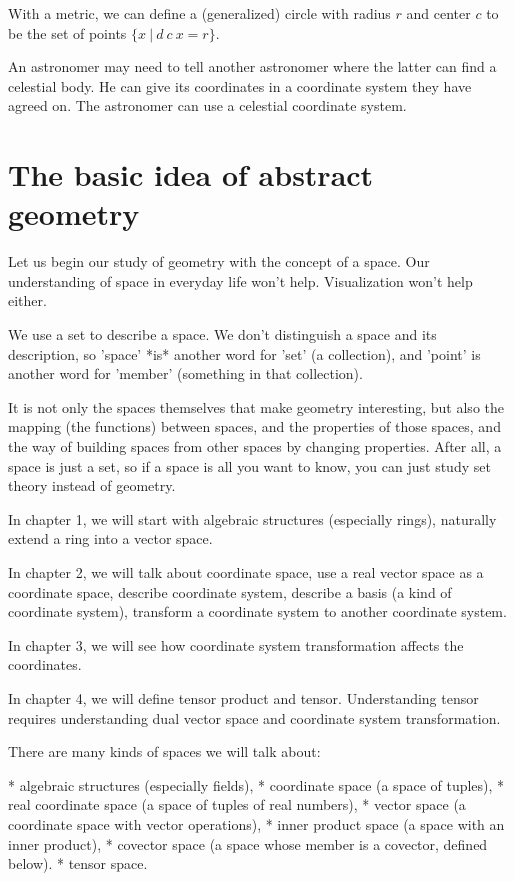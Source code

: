With a metric, we can define
a (generalized) circle with radius $r$ and center $c$
to be the set of points
$\{x ~|~ d~c~x = r \}$.

An astronomer may need to tell another astronomer where the latter can find a celestial body.
He can give its coordinates in a coordinate system they have agreed on.
The astronomer can use a celestial coordinate system.

\section{The basic idea of abstract geometry}

Let us begin our study of geometry with the concept of a space.
Our understanding of space in everyday life won't help.
Visualization won't help either.

We use a set to describe a space.
We don't distinguish a space and its description,
so 'space' *is* another word for 'set' (a collection),
and 'point' is another word for 'member' (something in that collection).

It is not only the spaces themselves that make geometry interesting,
but also the mapping (the functions) between spaces,
and the properties of those spaces,
and the way of building spaces from other spaces by changing properties.
After all, a space is just a set,
so if a space is all you want to know,
you can just study set theory instead of geometry.

In chapter 1,
we will
start with algebraic structures (especially rings),
naturally extend a ring into a vector space.

In chapter 2,
we will talk about coordinate space,
use a real vector space as a coordinate space,
describe coordinate system,
describe a basis (a kind of coordinate system),
transform a coordinate system to another coordinate system.

In chapter 3,
we will see how coordinate system transformation affects the coordinates.

In chapter 4,
we will define tensor product and tensor.
Understanding tensor requires understanding
dual vector space and coordinate system transformation.

There are many kinds of spaces we will talk about:

* algebraic structures (especially fields),
* coordinate space (a space of tuples),
* real coordinate space (a space of tuples of real numbers),
* vector space (a coordinate space with vector operations),
* inner product space (a space with an inner product),
* covector space (a space whose member is a covector, defined below).
* tensor space.

